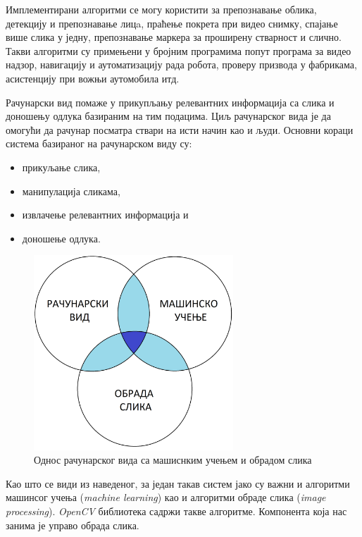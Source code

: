 \documentclass[12pt,a4paper,serbian,oneside]{book}
\begin{document}
Имплементирани алгоритми се могу користити за  препознавање облика, детекцију и препознавање лицa, праћење покрета при видео снимку, спајање више слика у једну, препознавање маркера за проширену стварност и слично. Такви алгоритми су примењени у бројним програмима попут програма за видео надзор, навигацију и аутоматизацију рада робота, проверу призвода у фабрикама, асистенцију при вожњи аутомобила итд.

Рачунарски вид помаже у прикупљању релевантних информација са слика и доношењу одлука базираним на тим подацима. Циљ рачунарског вида је да омогући да рачунар посматра ствари на исти начин као и људи. Основни кораци система базираног на рачунарском виду су:

\begin{itemize} \itemsep1pt \parskip0pt 
  \item прикуљање слика,
  \item манипулација сликама,
  \item извлачење релевантних информација и
  \item доношење одлука.
\end{itemize}

\begin{figure}[h]
\begin{center}
\includegraphics[width=75mm]{images/cv.png}
\end{center}
\caption{Однос рачунарског вида са машиснким учењем и обрадом слика}
\label{fig:cv}
\end{figure}

Као што се види из наведеног, за један такав систем јако су важни и алгоритми машинсог учења (\textit{machine learning}) као и алгоритми обраде слика (\textit{image processing}). \textit{OpenCV} библиотека садржи такве алгоритме. Компонента која нас занима је управо обрада слика.
\end{document}
